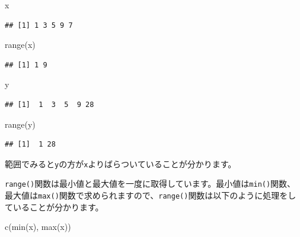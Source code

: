 \documentclass[
  12pt,
]{book}
\newenvironment{Shaded}{\begin{snugshade}}{\end{snugshade}}
\newcommand{\FunctionTok}[1]{\textcolor[rgb]{0.00,0.00,0.00}{#1}}
\newcommand{\NormalTok}[1]{#1}
\begin{document}
\begin{Shaded}
\begin{Highlighting}[numbers=left,,]
\NormalTok{x}
\end{Highlighting}
\end{Shaded}

\begin{verbatim}
## [1] 1 3 5 9 7
\end{verbatim}

\begin{Shaded}
\begin{Highlighting}[numbers=left,,]
\FunctionTok{range}\NormalTok{(x)}
\end{Highlighting}
\end{Shaded}

\begin{verbatim}
## [1] 1 9
\end{verbatim}

\begin{Shaded}
\begin{Highlighting}[numbers=left,,]
\NormalTok{y}
\end{Highlighting}
\end{Shaded}

\begin{verbatim}
## [1]  1  3  5  9 28
\end{verbatim}

\begin{Shaded}
\begin{Highlighting}[numbers=left,,]
\FunctionTok{range}\NormalTok{(y)}
\end{Highlighting}
\end{Shaded}

\begin{verbatim}
## [1]  1 28
\end{verbatim}

範囲でみると\texttt{y}の方が\texttt{x}よりばらついていることが分かります。

\texttt{range()}関数は最小値と最大値を一度に取得しています。最小値は\texttt{min()}関数、最大値は\texttt{max()}関数で求められますので、\texttt{range()}関数は以下のように処理をしていることが分かります。

\begin{Shaded}
\begin{Highlighting}[numbers=left,,]
\FunctionTok{c}\NormalTok{(}\FunctionTok{min}\NormalTok{(x), }\FunctionTok{max}\NormalTok{(x))}
\end{Highlighting}
\end{Shaded}
\end{document}
